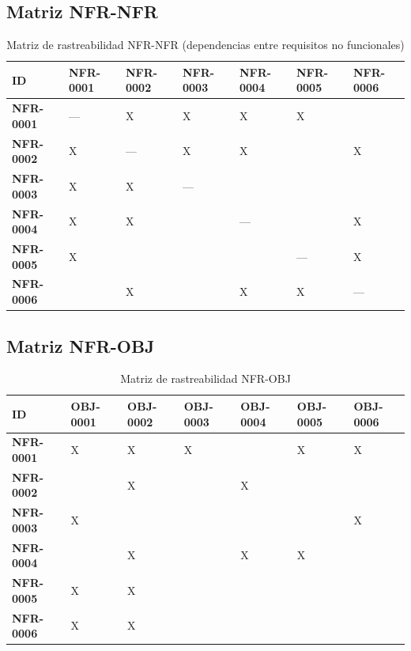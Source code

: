 \documentclass[11pt, a4paper]{article}
\begin{document}
\subsection{Matriz NFR-NFR}

{\setlength{\tabcolsep}{3pt}
\begin{table}[htbp]
\centering
\footnotesize
\begin{tabular}{|p{1.6cm}|p{1.65cm}|p{1.65cm}|p{1.65cm}|p{1.65cm}|p{1.65cm}|p{1.65cm}|}
\hline
\textbf{ID} & \textbf{NFR-0001} & \textbf{NFR-0002} & \textbf{NFR-0003} & \textbf{NFR-0004} & \textbf{NFR-0005} & \textbf{NFR-0006} \\
\hline
\hline
\textbf{NFR-0001} & --- & X & X & X & X & \\
\hline
\textbf{NFR-0002} & X & --- & X & X & & X \\
\hline
\textbf{NFR-0003} & X & X & --- & & & \\
\hline
\textbf{NFR-0004} & X & X & & --- & & X \\
\hline
\textbf{NFR-0005} & X & & & & --- & X \\
\hline
\textbf{NFR-0006} & & X & & X & X & --- \\
\hline
\end{tabular}
\caption{Matriz de rastreabilidad NFR-NFR (dependencias entre requisitos no funcionales)}
\label{tab:matriz-nfr-nfr}
\end{table}}

\subsection{Matriz NFR-OBJ}

\begin{table}[htbp]
\centering
\small
\begin{tabular}{|p{2.2cm}|p{2.0cm}|p{2.0cm}|p{2.0cm}|p{2.0cm}|p{2.0cm}|p{2.0cm}|}
\hline
\textbf{ID} & \textbf{OBJ-0001} & \textbf{OBJ-0002} & \textbf{OBJ-0003} & \textbf{OBJ-0004} & \textbf{OBJ-0005} & \textbf{OBJ-0006} \\
\hline
\hline
\textbf{NFR-0001} & X & X & X & & X & X \\
\hline
\textbf{NFR-0002} & & X & & X & & \\
\hline
\textbf{NFR-0003} & X & & & & & X \\
\hline
\textbf{NFR-0004} & & X & & X & X & \\
\hline
\textbf{NFR-0005} & X & X & & & & \\
\hline
\textbf{NFR-0006} & X & X & & & & \\
\hline
\end{tabular}
\caption{Matriz de rastreabilidad NFR-OBJ}
\label{tab:matriz-nfr-obj}
\end{table}
\end{document}
